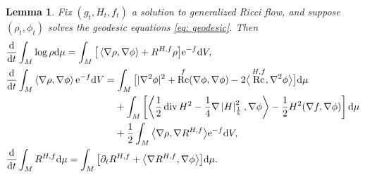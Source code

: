 \documentclass[pdftex]{sigma}
\numberwithin{equation}{section}
\newtheorem{Lemma}[thm]{Lemma}
\newcommand{\del}{\partial}
\newcommand{\N}{\nabla}
\newcommand{\IP}[1]{\left<#1\right>}
\newcommand{\wnorm}[1]{\left|#1\right|^2_{\frac1k}}
\DeclareMathOperator{\Rc}{Rc}
\DeclareMathOperator{\divg}{div}
\begin{document}
\begin{Lemma}\label{lem: evolution entropy 2} Fix $(g_t, H_t, f_t)$ a solution to generalized Ricci flow, and suppose $(\rho_t,\phi_t)$ solves the geodesic equations \eqref{eq: geodesic}. Then
	\begin{align*}
	&\frac{{\rm d}}{{\rm d}t} \int_M \log\rho {\rm d}\mu= \int_M \big[\IP{\N\rho,\N\phi}+R^{H,f}\rho \big]{\rm e}^{-f} {\rm d}V,\\
	&\frac{{\rm d}}{{\rm d}t} \int_M \IP{\N\rho,\N\phi}{\rm e}^{-f} {\rm d}V=\int_M \big[|\N^2\phi|^2+\Rc^f(\N\phi,\N\phi)-2\big\langle\Rc^{H,f},\N^2\phi\big\rangle \big] {\rm d}\mu\\
	&\phantom{\frac{{\rm d}}{{\rm d}t} \int_M \IP{\N\rho,\N\phi}{\rm e}^{-f} {\rm d}V=}{} +\int_M \left[ \IP{\frac12\divg H^2 - \frac1{4}\N\wnorm{H},\N \phi} - \frac12 H^2(\N f, \N \phi) \right] {\rm d}\mu\\
	&\phantom{\frac{{\rm d}}{{\rm d}t} \int_M \IP{\N\rho,\N\phi}{\rm e}^{-f} {\rm d}V=}{} +\frac12\int_M \big\langle\N\rho,\N R^{H,f}\big\rangle{\rm e}^{-f} {\rm d}V,\\
	&\frac{{\rm d}}{{\rm d}t}\int_M R^{H,f} {\rm d}\mu
	=\int_M \big[ \del_t R^{H,f} +\big\langle\N R^{H,f},\N\phi\big\rangle \big] {\rm d}\mu.
	\end{align*}
\end{Lemma}
\end{document}
